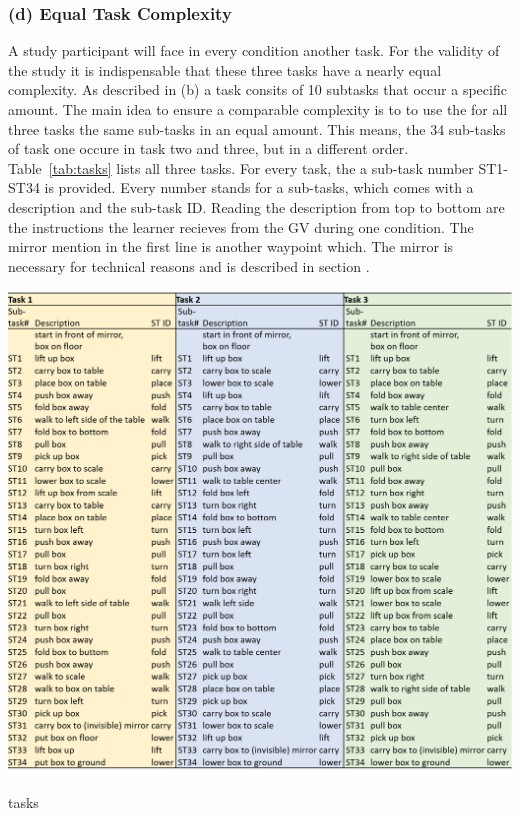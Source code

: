 \subsubsection{(d) Equal Task Complexity}
A study participant will face in every condition another task. For the validity of the study it is indispensable that these three tasks have a nearly equal complexity. As described in (b) a task consits of 10 subtasks that occur a specific amount. The main idea to ensure a comparable complexity is to to use the for all three tasks the same sub-tasks in an equal amount. This means, the 34 sub-tasks of task one occure in task two and three, but in a different order. Table~\ref{tab:tasks} lists all three tasks. For every task, the a sub-task number ST1-ST34 is provided. Every number stands for a sub-tasks, which comes with a description and the sub-task ID. Reading the description from top to bottom are the instructions the learner recieves from the GV during one condition. The mirror mention in the first line is another waypoint which. The mirror is necessary for technical reasons and is described in section .

\begin{table}[H]
	\centering
	\includegraphics[width=\textwidth]{figures/tasks.png}
	\caption[Description of tasks]{tasks}
	\label{tab:tasks}
\end{table}

